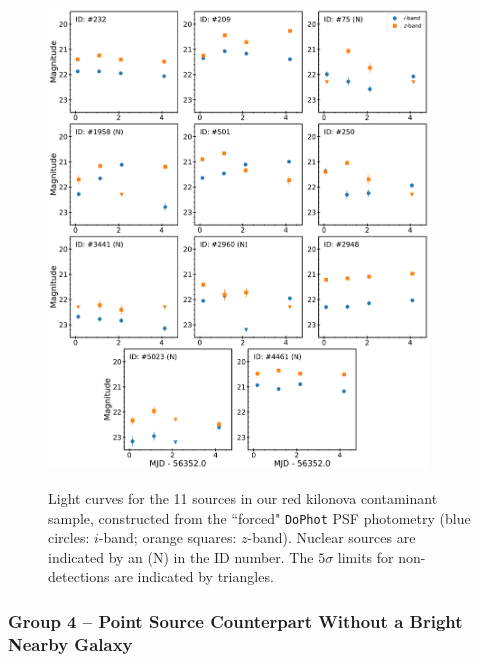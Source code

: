 \begin{figure}[!t]
\begin{center}
\hspace*{-0.1in}
\scalebox{1.}
{\includegraphics[width=0.9\textwidth]{./figs/chapter3/f4.pdf}}
\caption{Light curves for the 11 sources in our red kilonova contaminant sample, constructed from the ``forced" {\tt DoPhot} PSF photometry (blue circles: $i$-band; orange squares: $z$-band). Nuclear sources are indicated by an (N) in the ID number. The $5\sigma$ limits for non-detections are indicated by triangles.}
\label{fig:ch3_final_lc_red}
\end{center}
\vspace{0.5cm}
\end{figure}

\subsubsection{Group 4 -- Point Source Counterpart Without a Bright Nearby Galaxy}
\label{sec:ch3_group4}

